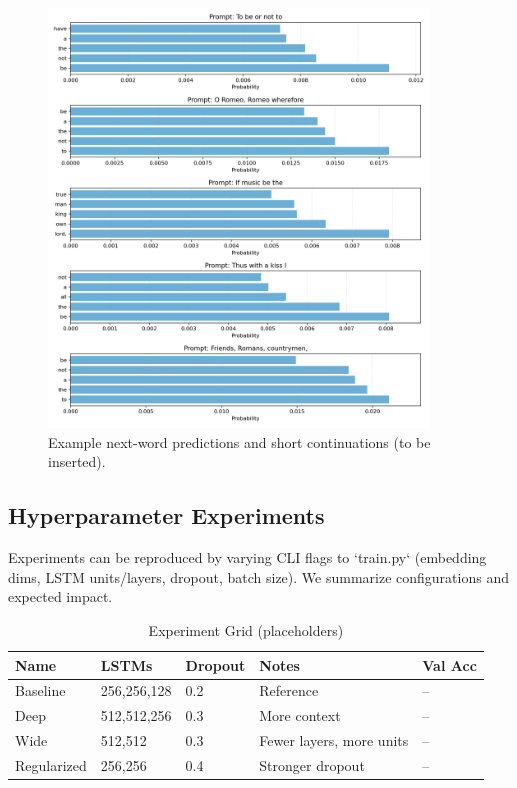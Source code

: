 \documentclass[12pt,a4paper]{article}
\begin{document}
\begin{figure}[H]
\centering
\includegraphics[width=0.9\textwidth]{reports/plots/q2_examples.png}
\caption{Example next-word predictions and short continuations (to be inserted).}
\label{fig:q2_examples}
\end{figure}

\subsection{Hyperparameter Experiments}

Experiments can be reproduced by varying CLI flags to `train.py` (embedding dims, LSTM units/layers, dropout, batch size). We summarize configurations and expected impact.

\begin{table}[H]
\centering
\caption{Experiment Grid (placeholders)}
\begin{tabular}{@{}lllll@{}}
\toprule
\textbf{Name} & \textbf{LSTMs} & \textbf{Dropout} & \textbf{Notes} & \textbf{Val Acc} \\ \midrule
Baseline & 256,256,128 & 0.2 & Reference & -- \\
Deep & 512,512,256 & 0.3 & More context & -- \\
Wide & 512,512 & 0.3 & Fewer layers, more units & -- \\
Regularized & 256,256 & 0.4 & Stronger dropout & -- \\ \bottomrule
\end{tabular}
\end{table}
\end{document}
